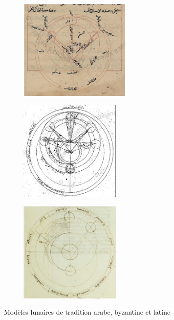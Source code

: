 	\begin{figure}[h]
		\begin{subfigure}{0.34\linewidth}
			\centering
			\includegraphics[width=5.5cm]{images/modele_lune_arabe.png}
		\end{subfigure}
		\hspace{1pt}
		\begin{subfigure}{0.30\linewidth}
			\centering
			\includegraphics[width=5cm]{images/modele_lune_byz.png}
		\end{subfigure}
  		\hspace{1pt}
  		\begin{subfigure}{0.30\linewidth}
			\centering
			\includegraphics[width=5cm]{images/modele_lune_latin.png}
		\end{subfigure}
		\caption{Modèles lunaires de tradition arabe, byzantine et latine}
		\label{fig:modeles_lune}
	\end{figure}
 
